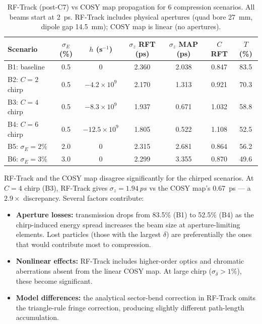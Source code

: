 \documentclass[11pt]{article}
\begin{document}
\begin{table}[ht]
\centering
\caption{RF-Track (post-C7) vs COSY map propagation for 6 compression
  scenarios.  All beams start at \SI{2}{ps}.  RF-Track includes
  physical apertures (quad bore \SI{27}{mm}, dipole gap \SI{14.5}{mm});
  COSY map is linear (no apertures).}
\label{tab:rftrack}
{\small
\begin{tabular}{@{} l c c S[table-format=1.3] S[table-format=1.3]
  S[table-format=1.3] S[table-format=2.1] @{}}
\toprule
{Scenario} & {$\sigma_E$ (\%)} & {$h$ (s$^{-1}$)}
  & {$\sigma_z$ RFT (ps)} & {$\sigma_z$ MAP (ps)}
  & {$C$ RFT} & {$T$ (\%)} \\
\midrule
B1: baseline      & 0.5 & 0           & 2.360 & 2.038 & 0.847 & 83.5 \\
B2: $C{=}2$ chirp     & 0.5 & $-4.2\times10^9$ & 2.170 & 1.313 & 0.921 & 70.3 \\
B3: $C{=}4$ chirp     & 0.5 & $-8.3\times10^9$ & 1.937 & 0.671 & 1.032 & 58.8 \\
B4: $C{=}6$ chirp     & 0.5 & $-12.5\times10^9$ & 1.805 & 0.522 & 1.108 & 52.5 \\
B5: $\sigma_E{=}2\%$ & 2.0 & 0          & 2.315 & 2.681 & 0.864 & 56.2 \\
B6: $\sigma_E{=}3\%$ & 3.0 & 0          & 2.299 & 3.355 & 0.870 & 49.6 \\
\bottomrule
\end{tabular}
}
\end{table}

RF-Track and the COSY map disagree significantly for the chirped
scenarios.  At $C = 4$ chirp (B3), RF-Track gives
$\sigma_z = \SI{1.94}{ps}$ vs the COSY map's \SI{0.67}{ps} --- a
$2.9\times$ discrepancy.  Several factors contribute:
\begin{itemize}
  \item \textbf{Aperture losses:} transmission drops from 83.5\% (B1)
    to 52.5\% (B4) as the chirp-induced energy spread increases the
    beam size at aperture-limiting elements.  Lost particles (those with
    the largest $\delta$) are preferentially the ones that would
    contribute most to compression.
  \item \textbf{Nonlinear effects:} RF-Track includes higher-order
    optics and chromatic aberrations absent from the linear COSY map.
    At large chirp ($\sigma_\delta > 1\%$), these become significant.
  \item \textbf{Model differences:} the analytical sector-bend
    correction in RF-Track omits the triangle-rule fringe correction,
    producing slightly different path-length accumulation.
\end{itemize}
\end{document}
